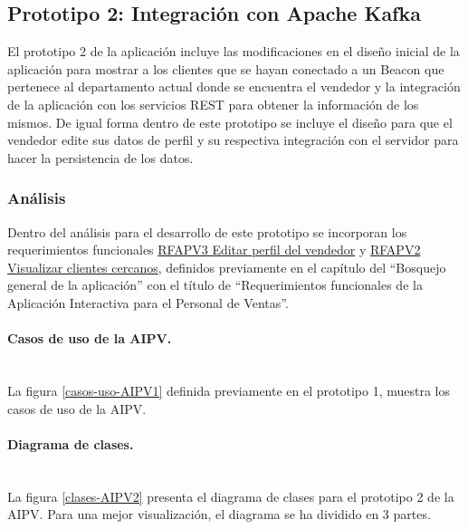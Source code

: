 \subsection{Prototipo 2: Integración con Apache Kafka}

El prototipo 2 de la aplicación incluye las modificaciones en el diseño inicial de la aplicación para mostrar a los clientes que se hayan conectado a un Beacon que pertenece al departamento actual donde se encuentra el vendedor y la integración de la aplicación con los servicios REST para obtener la información de los mismos. De igual forma dentro de este prototipo se incluye el diseño para que el vendedor edite sus datos de perfil y su respectiva integración con el servidor para hacer la persistencia de los datos. \\ \par

\subsubsection{Análisis}

Dentro del análisis para el desarrollo de este prototipo se incorporan los requerimientos funcionales \hyperlink{RFAPV}{RFAPV3 Editar perfil del vendedor} y \hyperlink{RFAPV}{RFAPV2 Visualizar clientes cercanos}, definidos previamente en el capítulo del ``Bosquejo general de la aplicación''  con el título de ``Requerimientos funcionales de la Aplicación Interactiva para el Personal de Ventas''. \\ \par

\paragraph{Casos de uso de la AIPV.} ~\\

La figura \ref{casos-uso-AIPV1} definida previamente en el prototipo 1, muestra los casos de uso de la AIPV.

\paragraph{Diagrama de clases.} ~\\

La figura \ref{clases-AIPV2} presenta el diagrama de clases para el prototipo 2 de la AIPV. Para una mejor visualización, el diagrama se ha dividido en 3 partes. 

